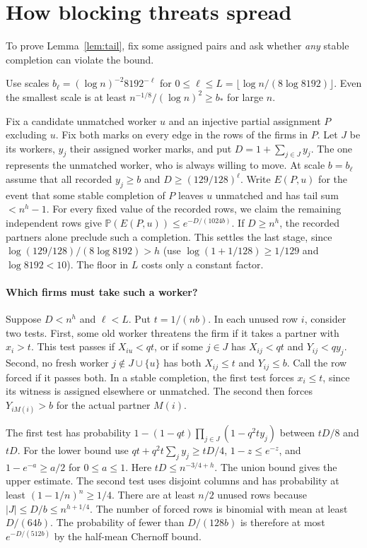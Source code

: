 \documentclass[11pt]{article}
\newcommand{\Prob}{\mathbb P}
\begin{document}
\appendix
\section{How blocking threats spread}\label{sec:propagation}

To prove Lemma~\ref{lem:tail}, fix some assigned pairs and ask whether
\emph{any} stable completion can violate the bound.

Use scales $b_\ell=(\log n)^{-2}8192^{-\ell}$ for
$0\le\ell\le L=\lfloor\log n/(8\log8192)\rfloor$. Even the smallest
scale is at least $n^{-1/8}/(\log n)^2\ge b_*$ for large $n$.

Fix a candidate unmatched worker $u$ and an injective partial assignment $P$
excluding $u$. Fix both marks on every edge in the rows of the firms in $P$.
Let $J$ be its workers, $y_j$ their assigned worker marks, and put
$D=1+\sum_{j\in J}y_j$. The one represents the unmatched worker, who
is always willing to move. At scale $b=b_\ell$ assume that all recorded
$y_j\ge b$ and $D\ge(129/128)^\ell$. Write $E(P,u)$ for the event that some
stable completion of $P$ leaves $u$ unmatched and has tail sum $<n^h-1$.
For every fixed value of the recorded rows, we claim the remaining independent
rows give $\Prob(E(P,u))\le e^{-D/(1024b)}$.
If $D\ge n^h$, the recorded partners alone preclude such a completion.
This settles the last stage, since
$\log(129/128)/(8\log8192)>h$ (use $\log(1+1/128)\ge1/129$ and
$\log8192<10$). The floor in $L$ costs only a constant factor.

\paragraph{Which firms must take such a worker?}
Suppose $D<n^h$ and $\ell<L$. Put $t=1/(nb)$.
In each unused row $i$, consider two tests.
First, some old worker threatens the firm if it takes a partner with
$x_i>t$. This test passes if $X_{iu}<qt$, or if some $j\in J$ has
$X_{ij}<qt$ and $Y_{ij}<q y_j$. Second, no fresh worker
$j\notin J\cup\{u\}$ has both $X_{ij}\le t$ and $Y_{ij}\le b$.
Call the row forced if it passes both. In a stable completion, the first
test forces $x_i\le t$, since its witness is assigned elsewhere or
unmatched. The second then forces $Y_{iM(i)}>b$ for the actual partner $M(i)$.

The first test has probability
$1-(1-qt)\prod_{j\in J}(1-q^2t y_j)$ between $tD/8$ and $tD$.
For the lower bound use $qt+q^2t\sum_j y_j\ge tD/4$,
$1-z\le e^{-z}$, and $1-e^{-a}\ge a/2$ for $0\le a\le1$.
Here $tD\le n^{-3/4+h}$. The union bound gives the upper estimate.
The second test uses disjoint columns and has probability at least
$(1-1/n)^n\ge1/4$. There are at least $n/2$ unused rows because
$|J|\le D/b\le n^{h+1/4}$. The number of forced rows is binomial with
mean at least $D/(64b)$. The probability of fewer than $D/(128b)$ is
therefore at most $e^{-D/(512b)}$ by the half-mean Chernoff bound.
\end{document}
